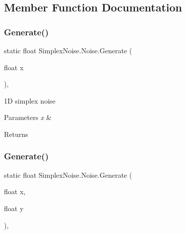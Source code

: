 \subsection{Member Function Documentation}
\mbox{\label{class_simplex_noise_1_1_noise_ab06f7e36078de3f6e050464076fae245}} 
\subsubsection{\texorpdfstring{Generate()}{Generate()}\hspace{0.1cm}{\footnotesize\ttfamily [1/2]}}
{\footnotesize\ttfamily static float Simplex\+Noise.\+Noise.\+Generate (\begin{DoxyParamCaption}\item[{float}]{x }\end{DoxyParamCaption})\hspace{0.3cm}{\ttfamily [inline]}, {\ttfamily [static]}}



1D simplex noise 


\begin{DoxyParams}{Parameters}
{\em x} & \\
\hline
\end{DoxyParams}
\begin{DoxyReturn}{Returns}

\end{DoxyReturn}
\mbox{\label{class_simplex_noise_1_1_noise_a4f34ca0d2996f9ea0d3a05eba853a6bd}} 
\subsubsection{\texorpdfstring{Generate()}{Generate()}\hspace{0.1cm}{\footnotesize\ttfamily [2/2]}}
{\footnotesize\ttfamily static float Simplex\+Noise.\+Noise.\+Generate (\begin{DoxyParamCaption}\item[{float}]{x,  }\item[{float}]{y }\end{DoxyParamCaption})\hspace{0.3cm}{\ttfamily [inline]}, {\ttfamily [static]}}



